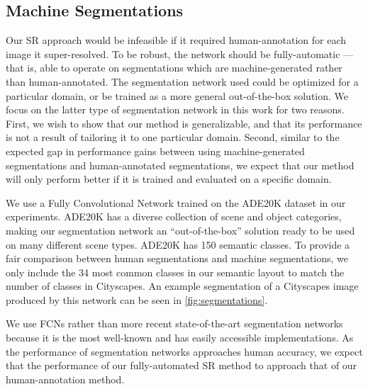 \documentclass[10pt,twocolumn,letterpaper]{article}
\begin{document}
\subsection{Machine Segmentations}
Our SR approach would be infeasible if it required human-annotation for each
image it super-resolved. To be robust, the network should be fully-automatic
--- that is, able to operate on segmentations which are machine-generated
rather than human-annotated. The segmentation network used could be optimized
for a particular domain, or be trained as a more general out-of-the-box
solution. We focus on the latter type of segmentation network in this work for
two reasons. First, we wish to show that our method is generalizable, and that
its performance is not a result of tailoring it to one particular domain.
Second, similar to the expected gap in performance gains between using
machine-generated segmentations and human-annotated segmentations, we expect
that our method will only perform better if it is trained and evaluated on a
specific domain.

We use a Fully Convolutional Network \cite{FullyConvolutionalSS} trained on the
ADE20K dataset \cite{ADE20K} in our experiments. ADE20K has a diverse
collection of scene and object categories, making our segmentation network an
``out-of-the-box'' solution ready to be used on many different scene types.
ADE20K has 150 semantic classes. To provide a fair comparison between human
segmentations and machine segmentations, we only include the 34 most common
classes in our semantic layout to match the number of classes in Cityscapes. An
example segmentation of a Cityscapes image produced by this network can be seen
in \ref{fig:segmentations}.

We use FCNs rather than more recent state-of-the-art segmentation networks
because it is the most well-known and has easily accessible implementations. As
the performance of segmentation networks approaches human accuracy, we expect
that the performance of our fully-automated SR method to approach that of our
human-annotation method.
\end{document}
